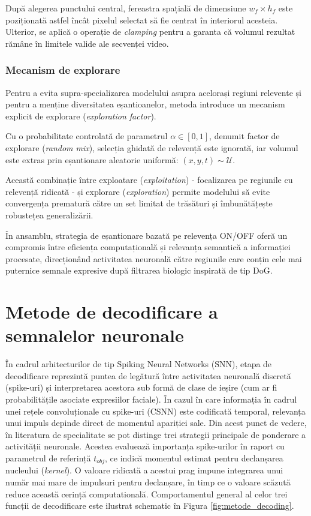 După alegerea punctului central, fereastra spațială de dimensiune $w_f \times h_f$ este poziționată astfel încât pixelul selectat să fie centrat în interiorul acesteia. Ulterior, se aplică o operație de \textit{clamping} pentru a garanta că volumul rezultat rămâne în limitele valide ale secvenței video.

\subsubsection{Mecanism de explorare}

Pentru a evita supra-specializarea modelului asupra acelorași regiuni relevente și pentru a menține diversitatea eșantioanelor, metoda introduce un mecanism explicit de explorare (\textit{exploration factor}).

Cu o probabilitate controlată de parametrul $\alpha \in [0,1]$, denumit factor de explorare (\textit{random mix}), selecția ghidată de relevență este ignorată, iar volumul este extras prin eșantionare aleatorie uniformă: $(x,y,t) \sim \mathcal{U}$.

Această combinație între exploatare (\textit{exploitation}) - focalizarea pe regiunile cu relevență ridicată - și explorare (\textit{exploration}) permite modelului să evite convergența prematură către un set limitat de trăsături și îmbunătățește robustețea generalizării.

În ansamblu, strategia de eșantionare bazată pe relevența ON/OFF oferă un compromis între eficiența computațională și relevanța semantică a informației procesate, direcționând activitatea neuronală către regiunile care conțin cele mai puternice semnale expresive după filtrarea biologic inspirată de tip DoG.

\section{Metode de decodificare a semnalelor neuronale}
În cadrul arhitecturilor de tip Spiking Neural Networks (SNN), etapa de decodificare reprezintă puntea de legătură între activitatea neuronală discretă (spike-uri) și interpretarea acestora sub formă de clase de ieșire (cum ar fi probabilitățile asociate expresiilor faciale). În cazul în care informația în cadrul unei rețele convoluționale cu spike-uri (CSNN) este codificată temporal, relevanța unui impuls depinde direct de momentul apariției sale. Din acest punct de vedere, în literatura de specialitate se pot distinge trei strategii principale de ponderare a activității neuronale. Acestea evaluează importanța spike-urilor în raport cu parametrul de referință $t_{obj}$, ce indică momentul estimat pentru declanșarea nucleului (\textit{kernel}). O valoare ridicată a acestui prag impune integrarea unui număr mai mare de impulsuri pentru declanșare, în timp ce o valoare scăzută reduce această cerință computatională. Comportamentul general al celor trei funcții de decodificare este ilustrat schematic în Figura \ref{fig:metode_decoding}.

